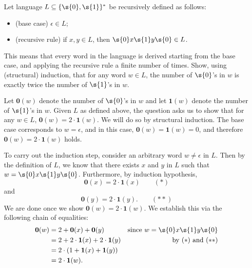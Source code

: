 \begin{flex}
\begin{exercise} \label{exercise:Structural-induction-on-words}
Let language $L \subseteq \{\s{0},\s{1}\}^*$ be recursively defined as follows:
\begin{itemize}
    \item (base case) $\epsilon \in L$;
    \item (recursive rule) if $x, y \in L$, then $\s{0}x\s{1}y\s{0} \in L$.
\end{itemize}
This means that every word in the language is derived starting from the base case, and applying the recursive rule a finite number of times. 
Show, using (structural) induction, that for any word $w \in L$, the number of $\s{0}$'s in $w$ is exactly twice the number of $\s{1}$'s in $w$.
\end{exercise}

\begin{solution}
Let $\mathbf{0}(w)$ denote the number of $\s{0}$'s in $w$ and let $\mathbf{1}(w)$ denote the number of $\s{1}$'s in $w$. Given $L$ as defined above, the question asks us to show that for any $w \in L$, $\mathbf{0}(w) = 2 \cdot \mathbf{1}(w)$. We will do so by structural induction.
The base case corresponds to $w = \epsilon$, and in this case, $\mathbf{0}(w) = \mathbf{1}(w) = 0$, and therefore $\mathbf{0}(w) = 2 \cdot \mathbf{1}(w)$ holds.

To carry out the induction step, consider an arbitrary word $w \neq \epsilon$ in $L$. Then by the definition of $L$, we know that there exists $x$ and $y$ in $L$ such that $w = \s{0}x\s{1}y\s{0}$. Furthermore, by induction hypothesis, 
\begin{equation*} %
    \mathbf{0}(x) = 2 \cdot \mathbf{1}(x) \quad \quad (*)
\end{equation*}
and 
\begin{equation*} %
    \mathbf{0}(y) = 2 \cdot \mathbf{1}(y). \quad \quad (**)
\end{equation*}
We are done once we show $\mathbf{0}(w) = 2 \cdot \mathbf{1}(w)$. We establish this via the following chain of equalities: 
\begin{align*}
    \mathbf{0}(w) & = 2 + \mathbf{0}(x) + \mathbf{0}(y) & \text{since $w = \s{0}x\s{1}y\s{0}$} \\
    & = 2 + 2 \cdot \mathbf{1}(x) + 2 \cdot \mathbf{1}(y) & \text{by $(*)$ and $(**)$}\\
    & = 2 \cdot (1 + \mathbf{1}(x) + \mathbf{1}(y)) \\
    & = 2 \cdot \mathbf{1}(w).
\end{align*}

\end{solution}
\end{flex}

